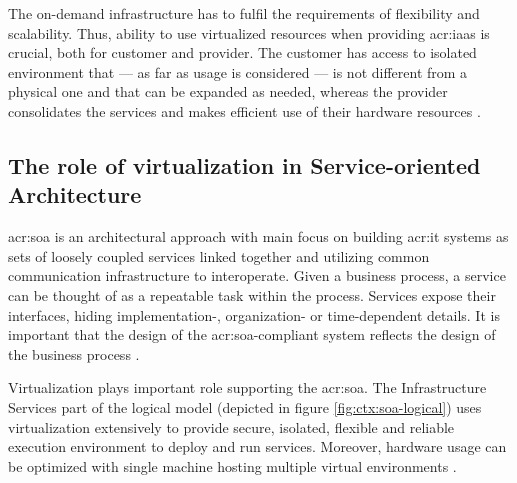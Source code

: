 \documentclass[11pt]{book}
\begin{document}
        The on-demand infrastructure has to fulfil the requirements of flexibility and scalability. Thus, ability to use
        virtualized resources when providing \gls{acr:iaas} is crucial, both for customer and provider. The customer has
        access to isolated environment that --- as far as usage is considered --- is not different from a physical one
        and that can be expanded as needed, whereas the provider consolidates the services and makes efficient use of
        their hardware resources \cite{iaas}.




      \subsection{The role of virtualization in Service-oriented Architecture}

        \gls{acr:soa} is an architectural approach with main focus on building \gls{acr:it} systems as sets of loosely
        coupled services linked together and utilizing common communication infrastructure to interoperate. Given a
        business process, a service can be thought of as a repeatable task within the process. Services expose their
        interfaces, hiding implementation-, organization- or time-dependent details. It is important that the design of
        the \gls{acr:soa}-compliant system reflects the design of the business process \cite{soa-foundation}.

        Virtualization plays important role supporting the \gls{acr:soa}. The Infrastructure Services part of the
        logical model (depicted in figure \ref{fig:ctx:soa-logical}) uses virtualization extensively to provide secure,
        isolated, flexible and reliable execution environment to deploy and run services. Moreover, hardware usage can
        be optimized with single machine hosting multiple virtual environments \cite{soa-foundation}.
\end{document}
